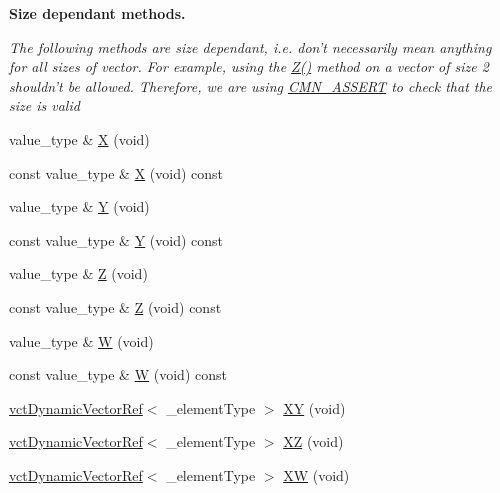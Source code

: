 \begin{Indent}{\bf Size dependant methods.}\par
{\em The following methods are size dependant, i.\-e. don't necessarily mean anything for all sizes of vector. For example, using the \hyperlink{classvct_dynamic_vector_base_aa689aa7d7b29bd5f370fd3a4f526419c}{Z()} method on a vector of size 2 shouldn't be allowed. Therefore, we are using \hyperlink{group__cisst_common_ga6a12b7031ea38ac5bf5937b8633c97ff}{C\-M\-N\-\_\-\-A\-S\-S\-E\-R\-T} to check that the size is valid }\begin{DoxyCompactItemize}
\item 
value\-\_\-type \& \hyperlink{classvct_dynamic_vector_base_ac1c2e4fabde849a5adc380e763f5a5a0}{X} (void)
\item 
const value\-\_\-type \& \hyperlink{classvct_dynamic_vector_base_a23d6b86c6aeda2974ec731e6e5b32286}{X} (void) const 
\item 
value\-\_\-type \& \hyperlink{classvct_dynamic_vector_base_ac824e0b7985c1665f8bb90c098f6bb1e}{Y} (void)
\item 
const value\-\_\-type \& \hyperlink{classvct_dynamic_vector_base_a7a7f871ea3a0350db5ee5da093426850}{Y} (void) const 
\item 
value\-\_\-type \& \hyperlink{classvct_dynamic_vector_base_aa689aa7d7b29bd5f370fd3a4f526419c}{Z} (void)
\item 
const value\-\_\-type \& \hyperlink{classvct_dynamic_vector_base_a933e0e8e08d777d86a02432d2568df47}{Z} (void) const 
\item 
value\-\_\-type \& \hyperlink{classvct_dynamic_vector_base_acdbaaa52e7ec8209050a6edac83e363a}{W} (void)
\item 
const value\-\_\-type \& \hyperlink{classvct_dynamic_vector_base_aef2206a0cf3908da039e445207990a66}{W} (void) const 
\item 
\hyperlink{classvct_dynamic_vector_ref}{vct\-Dynamic\-Vector\-Ref}$<$ \-\_\-element\-Type $>$ \hyperlink{classvct_dynamic_vector_base_ac5eb55ee30f87e702d1bcb521739c923}{X\-Y} (void)
\item 
\hyperlink{classvct_dynamic_vector_ref}{vct\-Dynamic\-Vector\-Ref}$<$ \-\_\-element\-Type $>$ \hyperlink{classvct_dynamic_vector_base_a89314df61e7549d378549ccb87ac626b}{X\-Z} (void)
\item 
\hyperlink{classvct_dynamic_vector_ref}{vct\-Dynamic\-Vector\-Ref}$<$ \-\_\-element\-Type $>$ \hyperlink{classvct_dynamic_vector_base_a8c0bad5e6b534f05a395cf4332829427}{X\-W} (void)
\item 

\end{DoxyCompactItemize}
\end{Indent}
